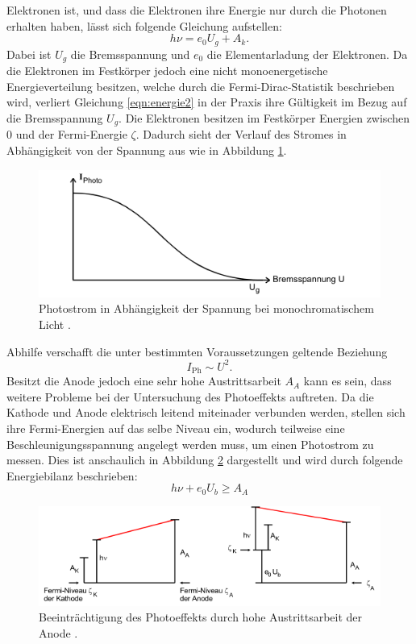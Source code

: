 Elektronen ist, und dass die Elektronen ihre Energie nur durch die Photonen erhalten haben, lässt sich folgende Gleichung aufstellen:
\begin{equation}
  h \nu = e_0 U_g + A_k .
  \label{eqn:energie2}
\end{equation}
Dabei ist $U_g$ die Bremsspannung und $e_0$ die Elementarladung der Elektronen.
Da die Elektronen im Festkörper jedoch eine nicht monoenergetische Energieverteilung besitzen, welche durch die Fermi-Dirac-Statistik beschrieben wird, verliert Gleichung \eqref{eqn:energie2} in der Praxis ihre Gültigkeit im Bezug auf
die Bremsspannung $U_g$. Die Elektronen besitzen im Festkörper Energien zwischen $0$ und der Fermi-Energie $\zeta$.
Dadurch sieht der Verlauf des Stromes in Abhängigkeit von der Spannung aus wie in Abbildung \ref{fig:iu}.
\begin{figure}
  \centering
  \includegraphics{images/iu.png}
  \caption{Photostrom in Abhängigkeit der Spannung bei monochromatischem Licht \cite{sample}.}
  \label{fig:iu}
\end{figure}
Abhilfe verschafft die unter bestimmten Voraussetzungen geltende Beziehung
\begin{equation}
  I_\text{Ph} \sim U^2 .
  \label{eqn:ipropu}
\end{equation}
Besitzt die Anode jedoch eine sehr hohe Austrittsarbeit $A_A$ kann es sein, dass weitere Probleme bei der Untersuchung des Photoeffekts auftreten. Da die Kathode und Anode elektrisch leitend miteinader verbunden werden, stellen sich ihre
Fermi-Energien auf das selbe Niveau ein, wodurch teilweise eine Beschleunigungsspannung angelegt werden muss, um einen Photostrom zu messen. Dies ist anschaulich in Abbildung \ref{fig:AA} dargestellt und wird durch folgende Energiebilanz
beschrieben:
\begin{equation}
  h \nu + e_0 U_b \geq A_A
  \label{eqn:energie3}
\end{equation}
\begin{figure}
  \centering
  \includegraphics{images/AA.png}
  \caption{Beeinträchtigung des Photoeffekts durch hohe Austrittsarbeit der Anode \cite{sample}.}
  \label{fig:AA}
\end{figure}

